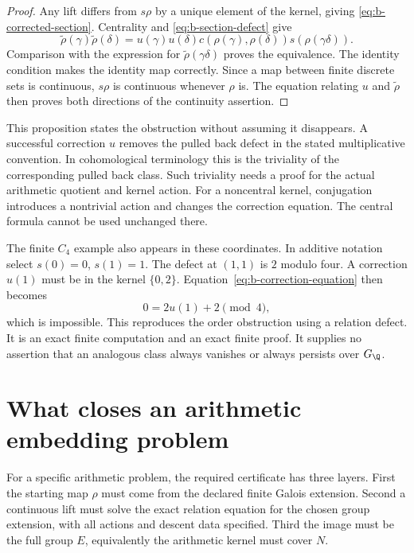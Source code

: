 \begin{proof}
Any lift differs from \(s\rho\) by a unique element of the kernel, giving \eqref{eq:b-corrected-section}. Centrality and \eqref{eq:b-section-defect} give
\[
 \widetilde\rho(\gamma)\widetilde\rho(\delta)
 =u(\gamma)u(\delta)c(\rho(\gamma),\rho(\delta))s(\rho(\gamma\delta)).
\]
Comparison with the expression for \(\widetilde\rho(\gamma\delta)\) proves the equivalence. The identity condition makes the identity map correctly. Since a map between finite discrete sets is continuous, \(s\rho\) is continuous whenever \(\rho\) is. The equation relating \(u\) and \(\widetilde\rho\) then proves both directions of the continuity assertion.
\end{proof}

This proposition states the obstruction without assuming it disappears. A successful correction \(u\) removes the pulled back defect in the stated multiplicative convention. In cohomological terminology this is the triviality of the corresponding pulled back class. Such triviality needs a proof for the actual arithmetic quotient and kernel action. For a noncentral kernel, conjugation introduces a nontrivial action and changes the correction equation. The central formula cannot be used unchanged there.

The finite \(C_4\) example also appears in these coordinates. In additive notation select \(s(0)=0\), \(s(1)=1\). The defect at \((1,1)\) is \(2\) modulo four. A correction \(u(1)\) must be in the kernel \(\{0,2\}\). Equation~\eqref{eq:b-correction-equation} then becomes
\[
 0=2u(1)+2\pmod4,
\]
which is impossible. This reproduces the order obstruction using a relation defect. It is an exact finite computation and an exact finite proof. It supplies no assertion that an analogous class always vanishes or always persists over \(G_{\Q}\).

\section{What closes an arithmetic embedding problem}

For a specific arithmetic problem, the required certificate has three layers. First the starting map \(\rho\) must come from the declared finite Galois extension. Second a continuous lift must solve the exact relation equation for the chosen group extension, with all actions and descent data specified. Third the image must be the full group \(E\), equivalently the arithmetic kernel must cover \(N\).

